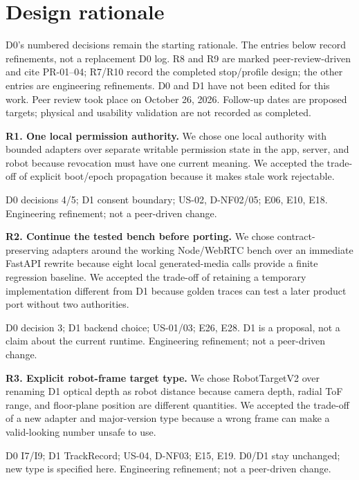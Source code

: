\documentclass[12pt,letterpaper]{article}
\begin{document}
\section{Design rationale}
D0's numbered decisions remain the starting rationale. The entries below record refinements, not a replacement D0 log. R8 and R9 are marked peer-review-driven and cite PR-01--04; R7/R10 record the completed stop/profile design; the other entries are engineering refinements. D0 and D1 have not been edited for this work. Peer review took place on October 26, 2026. Follow-up dates are proposed targets; physical and usability validation are not recorded as completed.

\begin{minipage}{\linewidth}
\textbf{R1. One local permission authority.} We chose one local authority with bounded adapters over separate writable permission state in the app, server, and robot because revocation must have one current meaning. We accepted the trade-off of explicit boot/epoch propagation because it makes stale work rejectable.

{\small D0 decisions 4/5; D1 consent boundary; US-02, D-NF02/05; E06, E10, E18. Engineering refinement; not a peer-driven change.\par}
\end{minipage}\par\medskip

\begin{minipage}{\linewidth}
\textbf{R2. Continue the tested bench before porting.} We chose contract-preserving adapters around the working Node/WebRTC bench over an immediate FastAPI rewrite because eight local generated-media calls provide a finite regression baseline. We accepted the trade-off of retaining a temporary implementation different from D1 because golden traces can test a later product port without two authorities.

{\small D0 decision 3; D1 backend choice; US-01/03; E26, E28. D1 is a proposal, not a claim about the current runtime. Engineering refinement; not a peer-driven change.\par}
\end{minipage}\par\medskip

\begin{minipage}{\linewidth}
\textbf{R3. Explicit robot-frame target type.} We chose RobotTargetV2 over renaming D1 optical depth as robot distance because camera depth, radial ToF range, and floor-plane position are different quantities. We accepted the trade-off of a new adapter and major-version type because a wrong frame can make a valid-looking number unsafe to use.

{\small D0 I7/I9; D1 TrackRecord; US-04, D-NF03; E15, E19. D0/D1 stay unchanged; new type is specified here. Engineering refinement; not a peer-driven change.\par}
\end{minipage}\par\medskip
\end{document}
